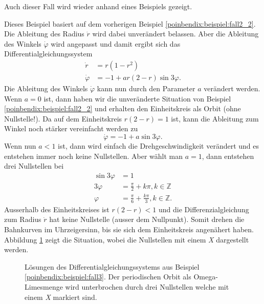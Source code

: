 Auch dieser Fall wird wieder anhand eines Beispiels gezeigt.

\begin{beispiel} \label{poinbendix:beispiel:fall3}

Dieses Beispiel basiert auf dem vorherigen Beispiel \ref{poinbendix:beispiel:fall2_2}.
Die Ableitung des Radius $\dot{r}$ wird dabei unverändert belassen.
Aber die Ableitung des Winkels $\dot{\varphi}$ wird angepasst und damit ergibt sich das Differentialgleichungssystem
\begin{align*}
    \dot{r}       &= r(1-r^2) \\
    \dot{\varphi} &= -1 + ar(2-r) \sin 3\varphi.
\end{align*}
Die Ableitung des Winkels $\dot{\varphi}$ kann nun durch den Parameter $a$ verändert werden.
Wenn $a=0$ ist, dann haben wir die unveränderte Situation von Beispiel \ref{poinbendix:beispiel:fall2_2} und erhalten den Einheitskreis als Orbit (ohne Nullstelle!).
Da auf dem Einheitskreis $r(2-r)=1$ ist, kann die Ableitung zum Winkel noch stärker vereinfacht werden zu
\begin{equation*}
    \dot{\varphi} = -1 + a \sin 3\varphi.
\end{equation*}
Wenn nun $a<1$ ist, dann wird einfach die Drehgeschwindigkeit verändert und es entstehen immer noch keine Nullstellen.
Aber wählt man $a=1$, dann entstehen drei Nullstellen bei
\begin{align*}
    \sin 3\varphi &= 1 \\
    3\varphi &= \frac{\pi}{2} + k\pi, k \in \mathbb{Z} \\
    \varphi &= \frac{\pi}{6} + \frac{k\pi}{3}, k \in \mathbb{Z}.
\end{align*}
Ausserhalb des Einheitskreises ist $r(2-r)<1$ und die Differenzialgleichung zum Radius $\dot{r}$ hat keine Nullstelle (ausser dem Nullpunkt).
Somit drehen die Bahnkurven im Uhrzeigersinn, bis sie sich dem Einheitskreis angenähert haben.
Abbildung \ref{poinbendix:fig:fall_3} zeigt die Situation, wobei die Nullstellen mit einem \textit{X} dargestellt werden.
\end{beispiel}

\begin{figure}
\centering
    
    \caption{Lösungen des Differentialgleichungssystems aus Beispiel \ref{poinbendix:beispiel:fall3}.
    Der periodischen Orbit als Omega-Limesmenge wird unterbrochen durch drei Nullstellen welche mit einem \textit{X} markiert sind.}
\label{poinbendix:fig:fall_3}
\end{figure}
